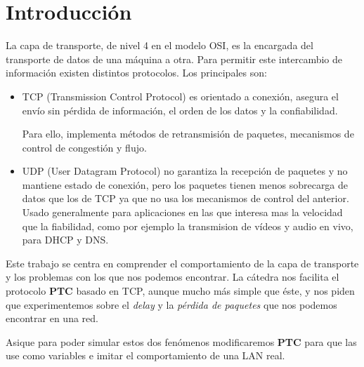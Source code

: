 \section{Introducci\'on}

La capa de transporte, de nivel 4 en el modelo OSI, es la encargada del transporte de datos de una m\'aquina a otra. Para permitir este intercambio de informaci\'on existen distintos protocolos. Los principales son: 

\begin{itemize}
 \item TCP (Transmission Control Protocol) es orientado a conexi\'on, asegura el env\'io sin p\'erdida de informaci\'on, el orden de los datos y la confiabilidad. 
 
 Para ello, implementa m\'etodos de retransmisi\'on de paquetes, mecanismos de control de congesti\'on y flujo. 
 
 \item UDP (User Datagram Protocol) no garantiza la recepci\'on de paquetes y no mantiene estado de conexi\'on, pero los paquetes tienen menos sobrecarga de datos que los de TCP ya que no usa los mecanismos de control del anterior. Usado generalmente para aplicaciones en las que interesa mas la velocidad que la fiabilidad, como por ejemplo la transmision de v\'ideos y audio en vivo, para DHCP y DNS. 
\end{itemize}

Este trabajo se centra en comprender el comportamiento de la capa de transporte y los problemas con los que nos podemos encontrar. La c\'atedra nos facilita el protocolo \textbf{PTC} basado en TCP, aunque mucho m\'as simple que \'este, y nos piden que experimentemos sobre el \emph{delay} y la \emph{p\'erdida de paquetes} que nos podemos encontrar en una red. 

Asique para poder simular estos dos fen\'omenos modificaremos \textbf{PTC} para que las use como variables e imitar el comportamiento de una LAN real. 